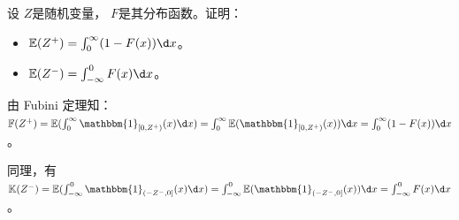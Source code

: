 \documentclass{ctexart}
\newif\ifpreface
\begin{document}
\large
\setlength{\baselineskip}{1.2em}
\ifpreface

\newgeometry{left=2cm,right=2cm,top=2cm,bottom=2cm}
\else
{}
\maketitle
\fi
\begin{problem}\label{pro:1}
  设 \(Z \)是随机变量， \(F \)是其分布函数。证明：
  \begin{itemize}
    \item \(\mathbb{E}(Z^+) = \int_{0}^{\infty}(1 - F(x)) \d x \)。
    \item \(\mathbb{E}(Z^-) = \int_{-\infty}^{0} F(x) \d x \)。
  \end{itemize}
\end{problem}
\begin{solution}
  由 Fubini 定理知：
  \(\mathbb{F}(Z^+)= \mathbb{E}(\int_{0}^{\infty} \mathbbm{1}_{[0,Z^+)}(x) \d x)= \int_{0}^{\infty} \mathbb{E}(\mathbbm{1}_{[0,Z^+)}(x)) \d x= \int_{0}^{\infty}(1-F(x)) \d x\)。

  同理，有
  \(\mathbb{K}(Z^-)= \mathbb{E}(\int_{-\infty}^{0} \mathbbm{1}_{(-Z^-,0]}(x) \d x)= \int_{-\infty}^{0}\mathbb{E}(\mathbbm{1}_{(-Z^-,0]}(x)) \d x= \int_{-\infty}^{0}F(x) \d x\)。
\end{solution}
\end{document}
